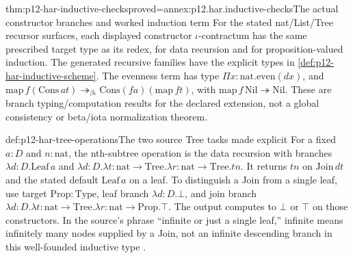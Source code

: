 \begin{hbtheorem}{thm:p12-har-inductive-checks}{proved=annex:p12.har.inductive-checks}{The actual constructor branches and worked induction term}
For the stated nat/List/Tree recursor surfaces, each displayed constructor
\(\iota\)-contractum has the same prescribed target type as its redex,
for data recursion and for proposition-valued induction. The generated
recursive families have the explicit types in
\cref{def:p12-har-inductive-scheme}. The evenness term has type
\(\Pi x:\mathrm{nat}.\mathrm{even}(dx)\), and
\(\mathrm{map}\,f(\mathrm{Cons}\,a t)
\twoheadrightarrow_{\beta\iota}
\mathrm{Cons}(fa)(\mathrm{map}\,f t)\), with
\(\mathrm{map}\,f\,\mathrm{Nil}\twoheadrightarrow\mathrm{Nil}\).
These are branch typing/computation results for the declared extension,
not a global consistency or beta/iota normalization theorem.
\end{hbtheorem}

\begin{hbexample}{def:p12-har-tree-operations}{The two source Tree tasks made explicit}
For a fixed \(a:D\) and \(n:\mathrm{nat}\), the nth-subtree
operation is the data recursion with branches
\(\lambda d:D.\mathrm{Leaf}\,a\) and
\(\lambda d:D.\lambda t:\mathrm{nat}\to\mathrm{Tree}.
\lambda r:\mathrm{nat}\to\mathrm{Tree}.tn\).
It returns \(tn\) on \(\mathrm{Join}\,d t\) and the stated
default \(\mathrm{Leaf}\,a\) on a leaf. To distinguish a Join
from a single leaf, use target \(\mathrm{Prop}:\mathrm{Type}\),
leaf branch \(\lambda d:D.\bot\), and join branch
\(\lambda d:D.\lambda t:\mathrm{nat}\to\mathrm{Tree}.
\lambda r:\mathrm{nat}\to\mathrm{Prop}.\top\).
The output computes to \(\bot\) or \(\top\) on those
constructors. In the source's phrase ``infinite or just a single leaf,''
infinite means infinitely many nodes supplied by a Join, not an infinite
descending branch in this well-founded inductive type
\cite[p.~1209]{BarendregtGeuvers2001}.
\end{hbexample}

